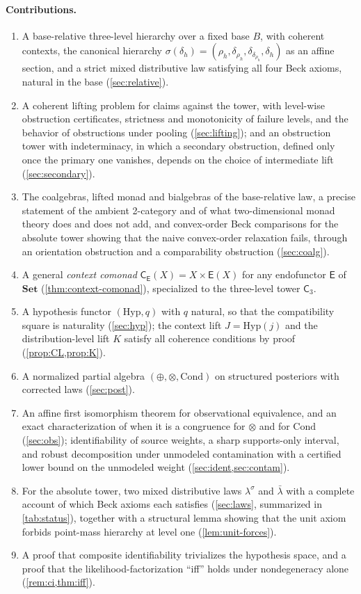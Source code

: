 \documentclass[11pt]{article}
\theoremstyle{definition}
\theoremstyle{remark}
\newcommand{\Set}{\mathbf{Set}}
\newcommand{\Hyp}{\mathrm{Hyp}}
\newcommand{\Cond}{\mathrm{Cond}}
\newcommand{\C}{\mathsf{C}}
\newcommand{\E}{\mathsf{E}}
\newcommand{\lb}{\bar\lambda}
\newcommand{\ls}{\lambda^{\sigma}}
\begin{document}
\paragraph{Contributions.}
\begin{enumerate}[leftmargin=*]
\item A base-relative three-level hierarchy over a fixed base $B$, with coherent contexts, the
  canonical hierarchy $\sigma(\delta_h)=(\rho_h,\delta_{\rho_h},\delta_{\delta_{\rho_h}},\delta_h)$ as an
  affine section, and a strict mixed distributive law satisfying all four Beck axioms, natural in the
  base (\cref{sec:relative}).
\item A coherent lifting problem for claims against the tower, with level-wise obstruction
  certificates, strictness and monotonicity of failure levels, and the behavior of obstructions under
  pooling (\cref{sec:lifting}); and an obstruction tower with indeterminacy, in which a secondary
  obstruction, defined only once the primary one vanishes, depends on the choice of intermediate lift
  (\cref{sec:secondary}).
\item The coalgebras, lifted monad and bialgebras of the base-relative law, a precise statement of
  the ambient 2-category and of what two-dimensional monad theory does and does not add, and
  convex-order Beck comparisons for the absolute tower showing that the naive convex-order
  relaxation fails, through an orientation obstruction and a comparability obstruction
  (\cref{sec:coalg}).
\item A general \emph{context comonad} $\C_\E(X)=X\times\E(X)$ for any endofunctor $\E$ of $\Set$
  (\cref{thm:context-comonad}), specialized to the three-level tower $\C_3$.
\item A hypothesis functor $(\Hyp,q)$ with $q$ natural, so that the compatibility square is
  naturality (\cref{sec:hyp}); the context lift $J=\Hyp(j)$ and the distribution-level lift $K$
  satisfy all coherence conditions by proof (\cref{prop:CL,prop:K}).
\item A normalized partial algebra $(\oplus,\otimes,\Cond)$ on structured posteriors with corrected
  laws (\cref{sec:post}).
\item An affine first isomorphism theorem for observational equivalence, and an exact
  characterization of when it is a congruence for $\otimes$ and for $\Cond$ (\cref{sec:obs});
  identifiability of source weights, a sharp supports-only interval, and robust decomposition under
  unmodeled contamination with a certified lower bound on the unmodeled weight
  (\cref{sec:ident,sec:contam}).
\item For the absolute tower, two mixed distributive laws $\ls$ and $\lb$ with a complete account
  of which Beck axioms each satisfies (\cref{sec:laws}, summarized in \cref{tab:status}), together with a structural lemma
  showing that the unit axiom forbids point-mass hierarchy at level one (\cref{lem:unit-forces}).
\item A proof that composite identifiability trivializes the hypothesis space, and a proof that the
  likelihood-factorization ``iff'' holds under nondegeneracy alone (\cref{rem:ci,thm:iff}).
\end{enumerate}
\end{document}

